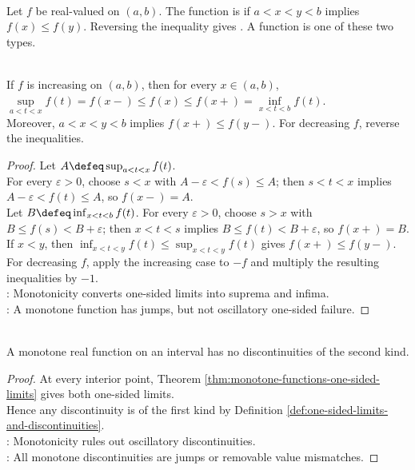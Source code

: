 \begin{definition} \label{def:monotone-real-function} \\
Let $f$ be real-valued on $(a,b)$. The function is  if $a<x<y<b$ implies $f(x)\leq f(y)$. Reversing the inequality gives . A  function is one of these two types.
\end{definition}

\begin{theorem} \label{thm:monotone-functions-one-sided-limits} \\
If $f$ is increasing on $(a,b)$, then for every $x\in(a,b)$, $\sup\limits_{a<t<x}f(t)=f(x-)\leq f(x)\leq f(x+)=\inf\limits_{x<t<b}f(t)$.\\
Moreover, $a<x<y<b$ implies $f(x+)\leq f(y-)$. For decreasing $f$, reverse the inequalities.
\begin{proof}
Let $A\defeq\sup_{a<t<x}f(t)$.\\
For every $\varepsilon>0$, choose $s<x$ with $A-\varepsilon<f(s)\leq A$; then $s<t<x$ implies $A-\varepsilon<f(t)\leq A$, so $f(x-)=A$.\\
Let $B\defeq\inf_{x<t<b}f(t)$. For every $\varepsilon>0$, choose $s>x$ with $B\leq f(s)<B+\varepsilon$; then $x<t<s$ implies $B\leq f(t)<B+\varepsilon$, so $f(x+)=B$. If $x<y$, then $\inf_{x<t<y}f(t)\leq\sup_{x<t<y}f(t)$ gives $f(x+)\leq f(y-)$.\\
For decreasing $f$, apply the increasing case to $-f$ and multiply the resulting inequalities by $-1$.\\
: Monotonicity converts one-sided limits into suprema and infima.\\
: A monotone function has jumps, but not oscillatory one-sided failure.
\end{proof}
\end{theorem}

\begin{corollary} \label{cor:monotone-no-second-kind-discontinuities} \\
A monotone real function on an interval has no discontinuities of the second kind.
\begin{proof}
At every interior point, Theorem \ref{thm:monotone-functions-one-sided-limits} gives both one-sided limits.\\
Hence any discontinuity is of the first kind by Definition \ref{def:one-sided-limits-and-discontinuities}.\\
: Monotonicity rules out oscillatory discontinuities.\\
: All monotone discontinuities are jumps or removable value mismatches.
\end{proof}
\end{corollary}


